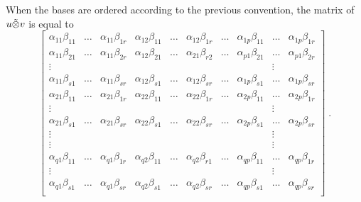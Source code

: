 \documentclass{report}
\theoremstyle{definition}
\theoremstyle{remark}
\begin{document}
   When the bases are ordered according to the previous convention, the matrix of $u\Tilde{\otimes} v$ is equal to 
    \begin{equation*} 
    \begin{bmatrix}
    \alpha_{11} \beta_{11} & \dots & \alpha_{11} \beta_{1r} & \alpha_{12} \beta_{11} & \dots & \alpha_{12} \beta_{1r} & \dots & \alpha_{1p} \beta_{11} & \dots & \alpha_{1p} \beta_{1r} \\
    
    \alpha_{11} \beta_{21} & \dots & \alpha_{11} \beta_{2r} & \alpha_{12} \beta_{21} & \dots & \alpha_{21} \beta_{r2} & \dots & \alpha_{p1}\beta_{21} & \dots & \alpha_{p1}\beta_{2r} \\
    \vdots & & & & & & & & \vdots \\
    \alpha_{11} \beta_{s1} & \dots & \alpha_{11} \beta_{sr} & \alpha_{12} \beta_{s1} & \dots & \alpha_{12} \beta_{sr} & \dots & \alpha_{1p}\beta_{s1} & \dots & \alpha_{1p}\beta_{sr} \\
    
    
    \alpha_{21} \beta_{11} & \dots & \alpha_{21} \beta_{1r} & \alpha_{22} \beta_{11} & \dots & \alpha_{22} \beta_{1r} & \dots & \alpha_{2p} \beta_{11} & \dots & \alpha_{2p} \beta_{1r} \\
      \vdots & & & & & & & & \vdots \\
    \alpha_{21} \beta_{s1} & \dots & \alpha_{21} \beta_{sr} & \alpha_{22} \beta_{s1} & \dots & \alpha_{22} \beta_{sr} & \dots & \alpha_{2p}\beta_{s1} & \dots & \alpha_{2p}\beta_{sr} \\
    
    
    \vdots & & & & & & & & \vdots \\
    \vdots & & & & & & & & \vdots \\
    
    \alpha_{q1} \beta_{11} & \dots & \alpha_{q1} \beta_{1r} & \alpha_{q2} \beta_{11} & \dots & \alpha_{q2} \beta_{r1} & \dots & \alpha_{qp} \beta_{11} & \dots & \alpha_{qp} \beta_{1r} \\
    
    \vdots & & & & & & & & \vdots \\
    
    \alpha_{q1} \beta_{s1} & \dots & \alpha_{q1} \beta_{sr} & \alpha_{q2} \beta_{s1} & \dots & \alpha_{q2} \beta_{sr} & \dots & \alpha_{qp} \beta_{s1} & \dots & \alpha_{qp} \beta_{sr} \\
    
    
    \end{bmatrix}\;.
    \end{equation*}
    
\end{document}
